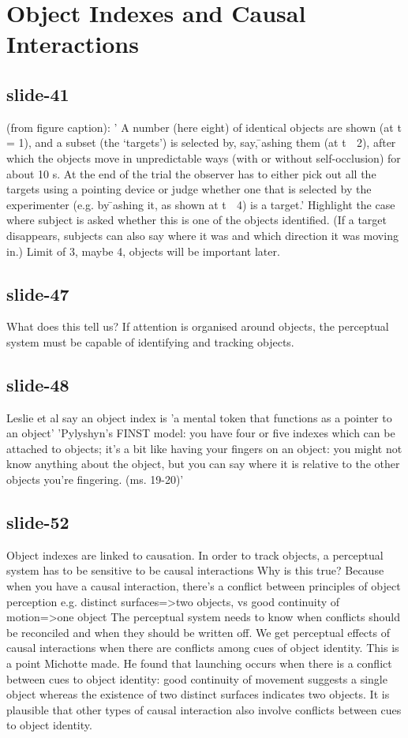 \documentclass[12pt,\papersize]{extarticle}
\begin{document}
\section{Object Indexes and Causal Interactions}
 
 
\subsection{slide-41}
(from figure caption): ' A number (here eight) of identical objects are shown (at t = 1), and a subset (the `targets') is selected by, say, ̄ashing them (at t 􏰈 2), after which the objects move in unpredictable ways (with or without self-occlusion) for about 10 s. At the end of the trial the observer has to either pick out all the targets using a pointing device or judge whether one that is selected by the experimenter (e.g. by ̄ashing it, as shown at t 􏰈 4) is a target.' \citep[p.\ 142]{Pylyshyn:2001hl}
Highlight the case where subject is asked whether this is one of the objects identified.
(If a target disappears, subjects can also say where it was and which direction it was moving in.)
Limit of 3, maybe 4, objects will be important later.
 
 
\subsection{slide-47}
What does this tell us?
If attention is organised around objects, the perceptual system must be capable of identifying and tracking objects.
 
 
\subsection{slide-48}
Leslie et al say an object index is 'a mental token that functions as a pointer to an object' \citep[p.\ 11]{Leslie:1998zk}
'Pylyshyn's FINST model: you have four or five indexes which can be attached to objects; it's a bit like having your fingers on an object: you might not know anything about the object, but you can say where it is relative to the other objects you're fingering. (ms. 19-20)' \citep{Scholl:1999mi}
 
 
\subsection{slide-52}
Object indexes are linked to causation.
In order to track objects, a perceptual system has to be sensitive to be causal interactions
Why is this true?
Because when you have a causal interaction, there's a conflict between principles of object perception e.g. distinct surfaces=>two objects, vs good continuity of motion=>one object
The perceptual system needs to know when conflicts should be reconciled and when they should be written off.
We get perceptual effects of causal interactions when there are conflicts among cues of object identity.
This is a point Michotte made. He found that launching occurs when there is a conflict between cues to object identity: good continuity of movement suggests a single object whereas the existence of two distinct surfaces indicates two objects.
It is plausible that other types of causal interaction also involve conflicts between cues to object identity.
 
\end{document}
